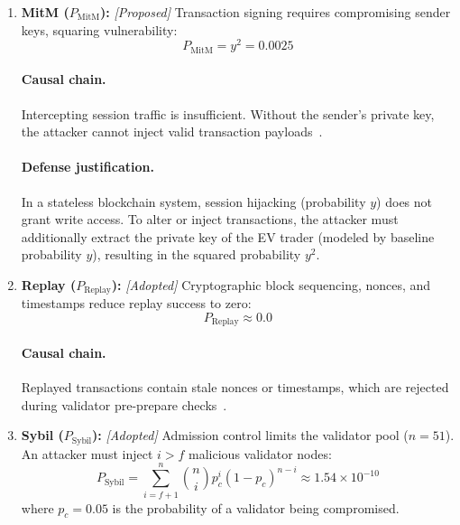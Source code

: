 \documentclass[10pt,twocolumn,journal]{IEEEtran}
\begin{document}
\begin{enumerate}[leftmargin=*]
    \paragraph{Defense justification.} In a decentralized configuration, $m$ local nodes must reach consensus, forming a fully mesh-connected local network with $k_1 = \frac{m(m-1)}{2}$ directional links. Since transmissions are signed, hijacking requires both routing-layer interception (probability $x^{k_1}$) and cryptographic session key extraction (probability $x^{k_1}$), producing $x^{2k_1}$.

    \item \textbf{MitM ($P_{\mathrm{MitM}}$):} \emph{[Proposed]} Transaction signing requires compromising sender keys, squaring vulnerability:
    \begin{equation}
    \label{eq:mitm_bc}
    P_{\mathrm{MitM}} = y^2 = 0.0025
    \end{equation}
    \paragraph{Causal chain.} Intercepting session traffic is insufficient. Without the sender's private key, the attacker cannot inject valid transaction payloads~\cite{baumeister2010}.
    \paragraph{Defense justification.} In a stateless blockchain system, session hijacking (probability $y$) does not grant write access. To alter or inject transactions, the attacker must additionally extract the private key of the EV trader (modeled by baseline probability $y$), resulting in the squared probability $y^2$.

    \item \textbf{Replay ($P_{\mathrm{Replay}}$):} \emph{[Adopted]} Cryptographic block sequencing, nonces, and timestamps reduce replay success to zero:
    \begin{equation}
    \label{eq:replay_bc}
    P_{\mathrm{Replay}} \approx 0.0
    \end{equation}
    \paragraph{Causal chain.} Replayed transactions contain stale nonces or timestamps, which are rejected during validator pre-prepare checks~\cite{yan2012}.

    \item \textbf{Sybil ($P_{\mathrm{Sybil}}$):} \emph{[Adopted]} Admission control limits the validator pool ($n=51$). An attacker must inject $i > f$ malicious validator nodes:
    \begin{equation}
    \label{eq:sybil_bc}
    P_{\mathrm{Sybil}} = \sum_{i=f+1}^{n} \binom{n}{i} p_c^i (1 - p_c)^{n-i} \approx 1.54 \times 10^{-10}
    \end{equation}
    where $p_c = 0.05$ is the probability of a validator being compromised.

\end{enumerate}
\end{document}
